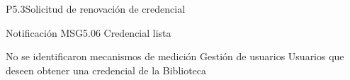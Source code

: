 \begin{Proceso}{P5.3}{Solicitud de renovación de credencial}
   { %
  }

   { %
    Notificación MSG5.06 Credencial lista
  }

   { %
  }

   { %
    No se identificaron mecanismos de medición
  }
   { %
    Gestión de usuarios
  }
   { %
    Usuarios que deseen obtener una credencial de la Biblioteca
  }


\end{Proceso}

